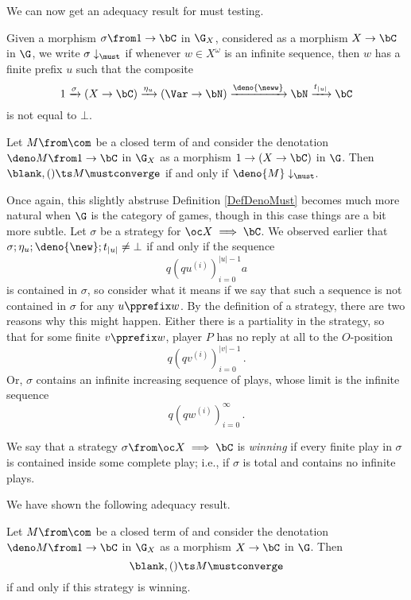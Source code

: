 We can now get an adequacy result for must testing.

\begin{definition}
  Given a morphism $\sigma\from 1\to\bC$ in $\G_X$, considered as a morphism $X \to \bC$ in $\G$, we write $\sigma\downarrow_{\must}$ if whenever $w\in X^\omega$ is an infinite sequence, then $w$ has a finite prefix $u$ such that the composite
  \[
    1 \xrightarrow{\sigma}
    (X \to \bC) \xrightarrow{\eta_u}
    (\Var \to \bN) \xrightarrow{\deno{\neww}}
    \bN \xrightarrow{t_{|u|}}
    \bC
    \]
  is not equal to $\bot$.
  \label{DefDenoMust}
\end{definition}

\begin{corollary}
  Let $M\from \com$ be a closed term of \IAX and consider the denotation $\deno M \from 1 \to \bC$ in $\G_X$ as a morphism $1 \to (X \to \bC)$ in $\G$.
  Then $\blank,()\ts M\mustconverge$ if and only if $\deno{M}\downarrow_{\must}$.
  \label{CorAdeqMust}
\end{corollary}

Once again, this slightly abstruse Definition \ref{DefDenoMust} becomes much more natural when $\G$ is the category of games, though in this case things are a bit more subtle.  
Let $\sigma$ be a strategy for $\oc X \implies \bC$.  
We observed earlier that $\sigma;\eta_u;\deno{\new};t_{|u|}\neq\bot$ if and only if the sequence
\[
  q(qu^{(i)})_{i=0}^{|u|-1} a
  \]
is contained in $\sigma$, so consider what it means if we say that such a sequence is not contained in $\sigma$ for any $u\pprefix w$.  
By the definition of a strategy, there are two reasons why this might happen.  
Either there is a partiality in the strategy, so that for some finite $v\pprefix w$, player $P$ has no reply at all to the $O$-position
\[
  q(qv^{(i)})_{i=0}^{|v|-1}\,.
  \]
Or, $\sigma$ contains an infinite increasing sequence of plays, whose limit is the infinite sequence
\[
  q(qw^{(i)})_{i=0}^\infty\,.
  \]
\begin{definition}
  We say that a strategy $\sigma\from \oc X \implies \bC$ is \emph{winning} if every finite play in $\sigma$ is contained inside some complete play; i.e., if $\sigma$ is total and contains no infinite plays.
\end{definition}

We have shown the following adequacy result.
\begin{corollary}
  Let $M\from \com$ be a closed term of \IAX and consider the denotation $\deno M \from 1 \to \bC$ in $\G_X$ as a morphism $X \to \bC$ in $\G$.
  Then 
  \[
    \blank,()\ts M\mustconverge
    \]
  if and only if this strategy is winning.
\end{corollary}

